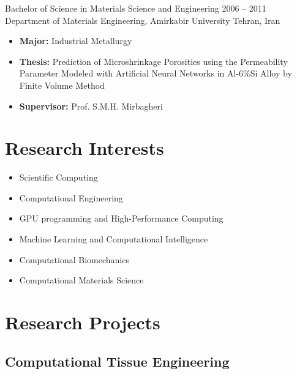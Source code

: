 \documentclass{cv}
\begin{document}
\longdatedsubsection
{Bachelor of Science in Materials Science and Engineering}
{2006 -- 2011} 
{Department of Materials Engineering, Amirkabir University} 
{Tehran, Iran} 

\begin{itemize}

\item 
\textbf{Major:} Industrial Metallurgy

\item
\textbf{Thesis:} Prediction of Microshrinkage Porosities using the Permeability Parameter Modeled with Artificial Neural Networks in Al-6\%Si Alloy by Finite Volume Method

\item
\textbf{Supervisor:} Prof. S.M.H. Mirbagheri


\end{itemize}


\section{Research Interests}

\begin{itemize}
\item
Scientific Computing
\item
Computational Engineering
\item
GPU programming and High-Performance Computing
\item
Machine Learning and Computational Intelligence
\item
Computational Biomechanics
\item
Computational Materials Science
\end{itemize}


\section{Research Projects}

\subsection{Computational Tissue Engineering}
\end{document}
